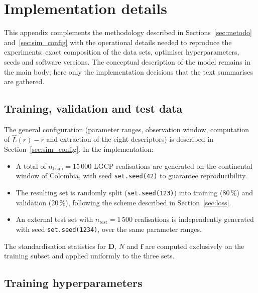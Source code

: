 \documentclass[a4paper,fleqn]{cas-sc}
\numberwithin{equation}{section}
\begin{document}
\appendix

\section{Implementation details}
\label{app:detalles}

This appendix complements the methodology described in
Sections~\ref{sec:metodo} and~\ref{sec:sim_config} with the
operational details needed to reproduce the experiments: exact
composition of the data sets, optimiser hyperparameters, seeds and
software versions. The conceptual description of the model remains
in the main body; here only the implementation decisions that the
text summarises are gathered.

\subsection{Training, validation and test data}
\label{app:trainingdata}

The general configuration (parameter ranges, observation window,
computation of $\hat{L}(r)-r$ and extraction of the eight
descriptors) is described in Section~\ref{sec:sim_config}. In the
implementation:
\begin{itemize}
    \item A total of $n_{\mathrm{train}}=15\,000$ LGCP realisations
    are generated on the continental window of Colombia, with seed
    \texttt{set.seed(42)} to guarantee reproducibility.
    \item The resulting set is randomly split
    (\texttt{set.seed(123)}) into training (80\,\%) and validation
    (20\,\%), following the scheme described in
    Section~\ref{sec:loss}.
    \item An external test set with $n_{\mathrm{test}}=1\,500$
    realisations is independently generated with seed
    \texttt{set.seed(1234)}, over the same parameter ranges.
\end{itemize}
The standardisation statistics for $\mathbf{D}$, $N$ and
$\mathbf{f}$ are computed exclusively on the training subset and
applied uniformly to the three sets.

\subsection{Training hyperparameters}
\label{app:training}
\end{document}
